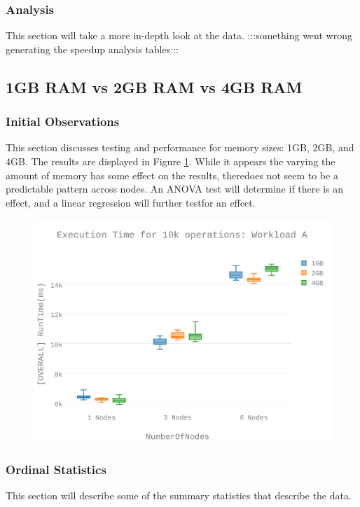 \subsubsection{Analysis}
This section will take a more in-depth look at the data.
:::something went wrong generating the speedup analysis tables:::

\subsection{1GB RAM vs 2GB RAM vs 4GB RAM}
\subsubsection{Initial Observations}
This section discusses testing and performance for memory sizes: 1GB, 2GB, and 4GB.  The results are displayed in Figure \ref{figures-wla_fig4}. While it appears the varying the amount of memory has some effect on the results, theredoes not seem to be a predictable pattern across nodes. An ANOVA test will determine if there is an effect, and a linear regression will further testfor an effect. \begin{figure}[h]
\includegraphics[width=5.5in]{Figures/figures-wla_fig4.pdf}
\caption{}
\label{figures-wla_fig4}
\end{figure}



\subsubsection{Ordinal Statistics}
This section will describe some of the summary statistics that describe the data.  

